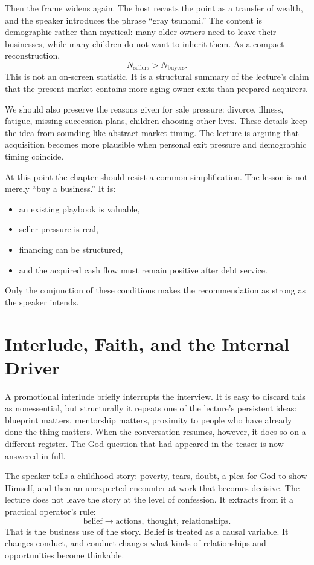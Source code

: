 Then the frame widens again. The host recasts the point as a transfer of wealth, and the speaker introduces the phrase ``gray tsunami.'' The content is demographic rather than mystical: many older owners need to leave their businesses, while many children do not want to inherit them. As a compact reconstruction,
\begin{equation}
N_{\text{sellers}} > N_{\text{buyers}}.
\end{equation}
This is not an on-screen statistic. It is a structural summary of the lecture's claim that the present market contains more aging-owner exits than prepared acquirers.

We should also preserve the reasons given for sale pressure: divorce, illness, fatigue, missing succession plans, children choosing other lives. These details keep the idea from sounding like abstract market timing. The lecture is arguing that acquisition becomes more plausible when personal exit pressure and demographic timing coincide.

At this point the chapter should resist a common simplification. The lesson is not merely ``buy a business.'' It is:
\begin{itemize}
\item an existing playbook is valuable,
\item seller pressure is real,
\item financing can be structured,
\item and the acquired cash flow must remain positive after debt service.
\end{itemize}
Only the conjunction of these conditions makes the recommendation as strong as the speaker intends.

\section{Interlude, Faith, and the Internal Driver}

A promotional interlude briefly interrupts the interview. It is easy to discard this as nonessential, but structurally it repeats one of the lecture's persistent ideas: blueprint matters, mentorship matters, proximity to people who have already done the thing matters. When the conversation resumes, however, it does so on a different register. The God question that had appeared in the teaser is now answered in full.

The speaker tells a childhood story: poverty, tears, doubt, a plea for God to show Himself, and then an unexpected encounter at work that becomes decisive. The lecture does not leave the story at the level of confession. It extracts from it a practical operator's rule:
\begin{equation}
\text{belief} \to \text{actions},\ \text{thought},\ \text{relationships}.
\end{equation}
That is the business use of the story. Belief is treated as a causal variable. It changes conduct, and conduct changes what kinds of relationships and opportunities become thinkable.

